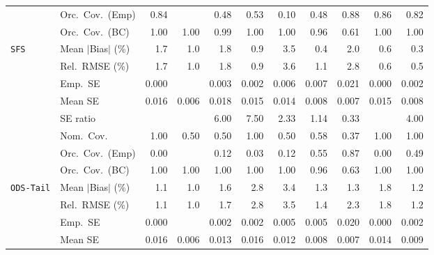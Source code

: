 \begin{landscape}
\begin{longtable}{llrrrrrrrrr}
 & Orc.\ Cov.\ (Emp) & \cellcolor{rankthree}0.84 &  & 0.48 & 0.53 & 0.10 & 0.48 & \cellcolor{rankone}0.88 & \cellcolor{ranktwo}0.86 & 0.82 \\
 & Orc.\ Cov.\ (BC) & \cellcolor{rankthree}1.00 & \cellcolor{rankthree}1.00 & \cellcolor{ranktwo}0.99 & \cellcolor{rankthree}1.00 & \cellcolor{rankthree}1.00 & \cellcolor{rankone}0.96 & 0.61 & \cellcolor{rankthree}1.00 & \cellcolor{rankthree}1.00 \\
\addlinespace[2pt]
\quad \texttt{SFS} & Mean $|$Bias$|$ (\%) & 1.7 & 1.0 & 1.8 & 0.9 & 3.5 & \cellcolor{ranktwo}0.4 & 2.0 & \cellcolor{rankthree}0.6 & \cellcolor{rankone}0.3 \\
 & Rel.\ RMSE (\%) & 1.7 & 1.0 & 1.8 & \cellcolor{rankthree}0.9 & 3.6 & 1.1 & 2.8 & \cellcolor{ranktwo}0.6 & \cellcolor{rankone}0.5 \\
 & Emp.\ SE & 0.000 &  & 0.003 & 0.002 & 0.006 & 0.007 & 0.021 & 0.000 & 0.002 \\
 & Mean SE & 0.016 & 0.006 & 0.018 & 0.015 & 0.014 & 0.008 & 0.007 & 0.015 & 0.008 \\
 & SE ratio &  &  & 6.00 & 7.50 & \cellcolor{rankthree}2.33 & \cellcolor{rankone}1.14 & \cellcolor{ranktwo}0.33 &  & 4.00 \\
 & Nom.\ Cov. & \cellcolor{rankone}1.00 & \cellcolor{rankthree}0.50 & \cellcolor{rankthree}0.50 & \cellcolor{rankone}1.00 & \cellcolor{rankthree}0.50 & \cellcolor{ranktwo}0.58 & 0.37 & \cellcolor{rankone}1.00 & \cellcolor{rankone}1.00 \\
 & Orc.\ Cov.\ (Emp) & 0.00 &  & 0.12 & 0.03 & 0.12 & \cellcolor{ranktwo}0.55 & \cellcolor{rankone}0.87 & 0.00 & \cellcolor{rankthree}0.49 \\
 & Orc.\ Cov.\ (BC) & \cellcolor{ranktwo}1.00 & \cellcolor{ranktwo}1.00 & \cellcolor{ranktwo}1.00 & \cellcolor{ranktwo}1.00 & \cellcolor{ranktwo}1.00 & \cellcolor{rankone}0.96 & \cellcolor{rankthree}0.63 & \cellcolor{ranktwo}1.00 & \cellcolor{ranktwo}1.00 \\
\addlinespace[2pt]
\quad \texttt{ODS-Tail} & Mean $|$Bias$|$ (\%) & \cellcolor{ranktwo}1.1 & \cellcolor{rankone}1.0 & 1.6 & 2.8 & 3.4 & 1.3 & 1.3 & 1.8 & \cellcolor{rankthree}1.2 \\
 & Rel.\ RMSE (\%) & \cellcolor{ranktwo}1.1 & \cellcolor{rankone}1.0 & 1.7 & 2.8 & 3.5 & 1.4 & 2.3 & 1.8 & \cellcolor{rankthree}1.2 \\
 & Emp.\ SE & 0.000 &  & 0.002 & 0.002 & 0.005 & 0.005 & 0.020 & 0.000 & 0.002 \\
 & Mean SE & 0.016 & 0.006 & 0.013 & 0.016 & 0.012 & 0.008 & 0.007 & 0.014 & 0.009 \\

\end{longtable}
\end{landscape}

